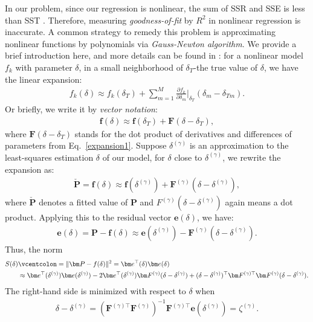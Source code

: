 In our problem, since our regression is nonlinear, the sum of SSR and SSE is less than SST \cite{Seber1989}. Therefore, measuring \emph{goodness-of-fit} by $R^2$ in nonlinear regression is inaccurate. A common strategy to remedy this problem is approximating nonlinear functions by polynomials via \emph{Gauss-Newton algorithm}. We provide a brief introduction here, and more details can be found in \cite{Seber1989}: for a nonlinear model $f_k$ with parameter $\delta$, in a small neighborhood of $\delta_T$-the true value of $\delta$, we have the linear expansion:
\begin{align}\label{expansion1}
	f_k(\delta) \approx f_k(\delta_T) + \sum_{m=1}^M \frac{\partial f_k}{\partial \delta_m} \Big \vert_{\delta_T} (\delta_m-\delta_{Tm}).
\end{align}
Or briefly, we write it by \emph{vector notation}:
\begin{align}
	\bm f(\delta) \approx \bm f(\delta_T) + \bm F (\delta-\delta_T),
\end{align}
where $\bm F (\delta-\delta_T)$ stands for the dot product of derivatives and differences of parameters from Eq.~\eqref{expansion1}. Suppose $\delta^{(\gamma)}$ is an approximation to the least-squares estimation $\delta$ of our model, for $\delta$ close to $\delta^{(\gamma)}$, we rewrite the expansion as:
\begin{align}
	\check{\bm P}=\bm f(\delta) \approx \bm f(\delta^{(\gamma)}) + \bm F^{(\gamma)}(\delta-\delta^{(\gamma)}),
\end{align}
where $\check{\bm P}$ denotes a fitted value of $\bm P$ and $F^{(\gamma)}(\delta-\delta^{(\gamma)})$ again means a dot product. Applying this to the residual vector $\bm e(\delta)$, we have:
\begin{align} \label{residualvector}
	\bm e(\delta) = \bm P - \bm f(\delta) \approx \bm e(\delta^{(\gamma)}) - \bm F^{(\gamma)}(\delta-\delta^{(\gamma)}).
\end{align}
Thus, the norm
\begin{align}
	S(\delta) & \vcentcolon = \Vert \bm P - f(\delta) \Vert^2 = \bm e^{\top}(\delta)\bm e(\delta) \notag \\
	& \approx \bm e^{\top}(\delta^{(\gamma)})\bm e(\delta^{(\gamma)}) -2\bm e^{\top}(\delta^{(\gamma)})\bm F^{(\gamma)}(\delta-\delta^{(\gamma)})+(\delta-\delta^{(\gamma)})^{\top}\bm F^{(\gamma)\top}\bm F^{(\gamma)}(\delta-\delta^{(\gamma)}).
\end{align}
The right-hand side is minimized with respect to $\delta$ when
\begin{align}
	\delta-\delta^{(\gamma)} = (\bm F^{(\gamma)\top}\bm F^{(\gamma)})^{-1}\bm F^{(\gamma)\top}\bm e(\delta^{(\gamma)}) = \zeta^{(\gamma)}.
\end{align}
